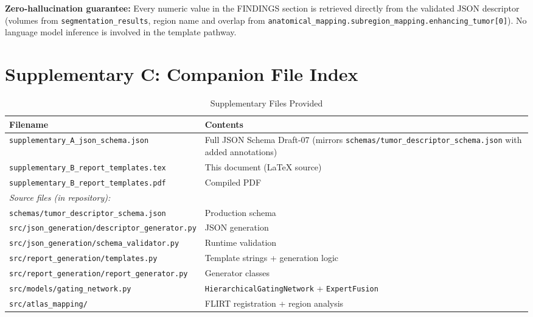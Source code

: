 \documentclass[conference]{IEEEtran}
\begin{document}
\noindent\textbf{Zero-hallucination guarantee:} Every numeric value in the FINDINGS section is retrieved directly from the validated JSON descriptor (volumes from \texttt{segmentation\_results}, region name and overlap from \texttt{anatomical\_mapping.subregion\_mapping.enhancing\_tumor[0]}). No language model inference is involved in the template pathway.

\section*{Supplementary C: Companion File Index}

\begin{table}[htbp]
\caption{Supplementary Files Provided}
\begin{center}
\begin{tabular}{l p{5cm}}
\toprule
\textbf{Filename} & \textbf{Contents} \\
\midrule
\texttt{supplementary\_A\_json\_schema.json} & Full JSON Schema Draft-07 (mirrors \texttt{schemas/tumor\_descriptor\_schema.json} with added annotations) \\
\texttt{supplementary\_B\_report\_templates.tex} & This document (LaTeX source) \\
\texttt{supplementary\_B\_report\_templates.pdf} & Compiled PDF \\
\midrule
\multicolumn{2}{l}{\textit{Source files (in repository):}} \\
\texttt{schemas/tumor\_descriptor\_schema.json} & Production schema \\
\texttt{src/json\_generation/descriptor\_generator.py} & JSON generation \\
\texttt{src/json\_generation/schema\_validator.py} & Runtime validation \\
\texttt{src/report\_generation/templates.py} & Template strings + generation logic \\
\texttt{src/report\_generation/report\_generator.py} & Generator classes \\
\texttt{src/models/gating\_network.py} & \texttt{HierarchicalGatingNetwork} + \texttt{ExpertFusion} \\
\texttt{src/atlas\_mapping/} & FLIRT registration + region analysis \\
\bottomrule
\end{tabular}
\end{center}
\end{table}
\end{document}
